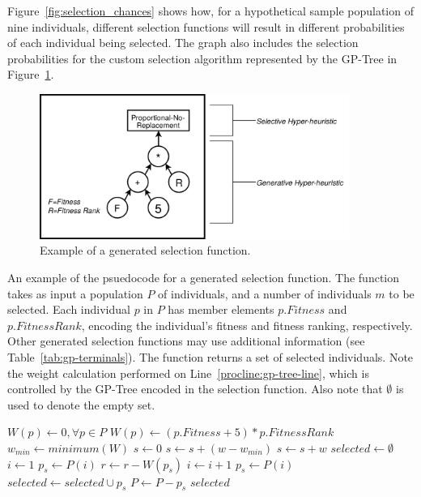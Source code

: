 \documentclass[times,12pt,titlepage]{mstogs}
\begin{document}
\begin{ThesisBody}
Figure~\ref{fig:selection_chances} shows how, for a hypothetical sample population of nine individuals, different selection functions will result in different probabilities of each individual being selected. The graph also includes the selection probabilities for the custom selection algorithm represented by the GP-Tree in Figure~\ref{fig:example_adpsea}. 

\begin{figure}
    \centering
    \includegraphics[width=0.9\textwidth]{example_eppsea}
    \caption{Example of a generated selection function.}
    \label{fig:example_adpsea}
\end{figure}

\begin{algorithm}
\caption{An example of the psuedocode for a generated selection function. The function takes as input a population $P$ of individuals, and a number of individuals $m$ to be selected. Each individual $p$ in $P$ has member elements $p.Fitness$ and $p.FitnessRank$, encoding the individual's fitness and fitness ranking, respectively. Other generated selection functions may use additional information (see Table~\ref{tab:gp-terminals}).  The function returns a set of selected individuals. Note the weight calculation performed on Line~\ref{procline:gp-tree-line}, which is controlled by the GP-Tree encoded in the selection function. Also note that $\emptyset$ is used to denote the empty set.}
\label{alg:ExampleSelection}
\begin{algorithmic}[1]
\label{proc:ExampleSelection}
	\State $W(p) \leftarrow 0,\forall p \in P$
		\State $W(p) \leftarrow (p.Fitness + 5)*p.FitnessRank$\label{procline:gp-tree-line}
	\EndFor
	\State $w_{min} \leftarrow minimum(W)$	
	\State $s \leftarrow 0$ 
			\State $s \leftarrow s + (w - w_{min} )$			
		\Else
			\State $s \leftarrow s + w$		
		\EndIf	
	\EndFor
	\State $selected \leftarrow \emptyset$
		\State $i \leftarrow 1$
		\State $p_s \leftarrow P(i)$
			\State $r \leftarrow r - W(p_s)$
			\State $i \leftarrow i + 1$
			\State $p_s \leftarrow P(i)$
		\EndWhile	
		\State $selected \leftarrow selected \cup p_s$
		\State $P \leftarrow P - p_s$
	\EndFor
	\State \Return $selected$
\EndFunction
\end{algorithmic}
\end{algorithm}


\end{ThesisBody}
\end{document}

